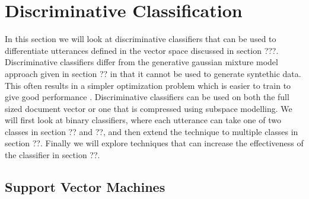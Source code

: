 \chapter{Discriminative Classification}

In this section we will look at discriminative classifiers that can be used to differentiate utterances defined in the vector space discussed in section ???. Discriminative classifiers differ from the generative gaussian mixture model approach given in section ?? in that it cannot be used to generate syntethic data. This often results in a simpler optimization problem which is easier to train to give good performance \cite[p. 204]{machinelearningbook}. Discriminative classifiers can be used on both the full sized document vector or one that is compressed using subspace modelling. We will first look at binary classifiers, where each utterance can take one of two classes in section ?? and ??, and then extend the technique to multiple classes in section ??. Finally we will explore techniques that can increase the effectiveness of the classifier in section ??.

\section{Support Vector Machines}

